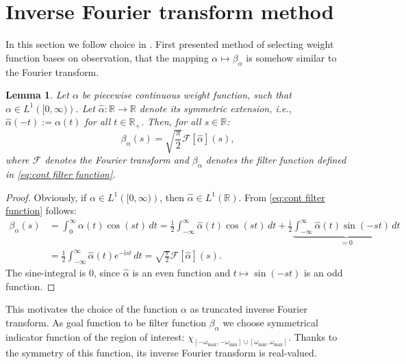 \documentclass[a4paper,11pt,bibliography=totoc,listof=totoc,headinclude=true,cleardoublepage=empty,oneside]{scrbook}
\newtheorem{lemma}[theorem]{Lemma}
\newcommand{\R}{\mathbb{R}}
\renewcommand{\i}{\mathrm{i}}
\newcommand{\F}{\mathcal{F}}
\begin{document}
\section{Inverse Fourier transform method}
In this section we follow choice in \cite{nannen}. First presented method of selecting weight function bases on observation, that the mapping $ \alpha \mapsto \beta_\alpha$ is somehow similar to the Fourier transform. 
\begin{lemma}\label{lemma:alpha fourier}
    Let $\alpha$ be piecewise continuous weight function, such that $\alpha \in L^1\left([0, \infty)\right)$. Let $\hat{\alpha}: \R \rightarrow \R$ denote its symmetric extension, i.e., $\hat{\alpha}(-t) := \alpha(t)$ for all $t\in \R_+$. Then, for all $s\in \R$:
    \begin{equation*}
        \beta_\alpha (s) = \sqrt{\frac{\pi}{2}} \F\left[\hat{\alpha}\right] (s),
    \end{equation*}
    where $\mathcal{F}$ denotes the Fourier transform and $\beta_\alpha$ denotes the filter function  defined in \eqref{eq:cont filter function}.
\end{lemma}
\begin{proof}
    Obviously, if $\alpha \in L^1\left([0, \infty)\right)$, then $\hat{\alpha} \in L^1\left(\R\right)$. From \eqref{eq:cont filter function} follows:
    \begin{align*}
        \beta_\alpha (s) &= \int_0^\infty \alpha(t) \cos(s t) \,dt = \frac{1}{2}\int_{-\infty}^\infty \hat{\alpha}(t) \cos(s t) \,dt + \frac{\i}{2} \underbrace{\int_{-\infty}^\infty \hat{\alpha}(t) \sin(-st) \,dt}_{=0} \\&= \frac{1}{2} \int_{-\infty}^{\infty} \hat{\alpha}(t) e^{-\i st} \, dt = \sqrt{\frac{\pi}{2}} \F\left[\hat{\alpha}\right] (s).
    \end{align*}
    The sine-integral is 0, since $\hat{\alpha}$ is an even function and $t \mapsto \sin(-st)$ is an odd function. 
\end{proof}

This motivates the choice of the function $\alpha$ as truncated inverse Fourier transform. As goal function to be filter function $\beta_\alpha$ we choose symmetrical indicator function of the region of interest: $\chi_{\left[-\omega_{\max}, -\omega_{\min}\right]\cup\left[\omega_{\min}, \omega_{\max}\right]}$. Thanks to the symmetry of this function, its inverse Fourier transform is real-valued.
\end{document}
